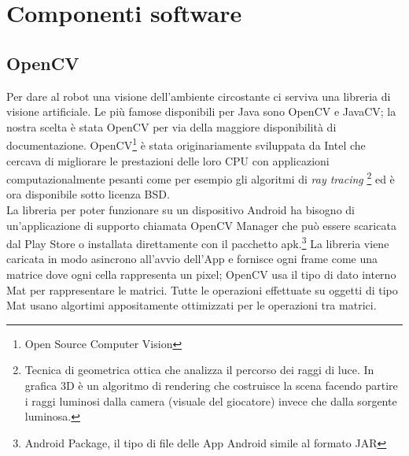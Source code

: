 \chapter{Componenti software}
\fancyfoot[C]{\thepage } 
\section {OpenCV}
Per dare al robot una visione dell'ambiente circostante ci serviva una libreria di 
visione artificiale. Le più famose disponibili per Java sono OpenCV e JavaCV; 
la nostra scelta è stata OpenCV per via della maggiore disponibilità di documentazione. 
OpenCV\footnote{Open Source Computer Vision} è stata originariamente sviluppata 
da Intel che cercava di migliorare le prestazioni delle loro CPU con applicazioni
computazionalmente pesanti come per esempio gli algoritmi di \textit{ray tracing}
\footnote{Tecnica di geometrica ottica che analizza il percorso dei raggi di luce.
In grafica 3D è un algoritmo di rendering che costruisce la scena facendo
partire i raggi luminosi dalla camera (visuale del giocatore) invece che dalla 
sorgente luminosa.\cite{ray_tracing}}  ed è ora disponibile sotto licenza BSD. 
\\La libreria per poter funzionare su un 
 dispositivo Android ha bisogno di un'applicazione di supporto chiamata OpenCV 
 Manager che può essere scaricata dal Play Store o installata direttamente con il
 pacchetto apk.\footnote{Android Package, il tipo di file delle App Android simile 
 al formato JAR } La libreria viene caricata in modo asincrono all'avvio dell'App
 e fornisce ogni frame come una matrice dove ogni cella rappresenta un pixel; 
 OpenCV usa il tipo di dato interno Mat per rappresentare le matrici.
 Tutte le operazioni effettuate su oggetti di tipo Mat usano algortimi appositamente 
 ottimizzati per le operazioni tra matrici. 

